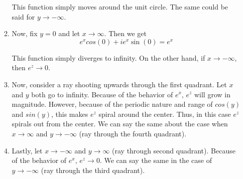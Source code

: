 \documentclass[11pt]{article}
\begin{document}
\begin{enumerate}
\begin{enumerate}
		This function simply moves around the unit circle. The same could be said for $y \rightarrow -\infty$.
		
		\item Now, fix $y = 0$ and let $x \rightarrow \infty$. Then we get
		\[e^xcos(0) + ie^x\sin(0) = e^x \]
		
		This function simply diverges to infinity. On the other hand, if $x \rightarrow -\infty$, then $e^z \rightarrow 0$.
		
		\item Now, consider a ray shooting upwards through the first quadrant. Let $x$ and $y$ both go to infinity. Because of the behavior of $e^x$, $e^z$ will grow in magnitude. However, because of the periodic nature and range of $cos(y)$ and $sin(y)$, this makes $e^z$ spiral around the center. Thus, in this case $e^z$ spirals out from the center. We can say the same about the case when $x \rightarrow \infty$ and $y \rightarrow -\infty$ (ray through the fourth quadrant).
		
		\item Lastly, let $x \rightarrow -\infty$ and $y \rightarrow \infty$ (ray through second quadrant). Because of the behavior of $e^x$, $e^z \rightarrow 0$. We can say the same in the case of $y \rightarrow -\infty$ (ray through the third quadrant).
	\end{enumerate}
\end{enumerate}
\end{document}
